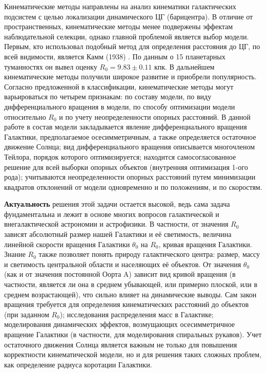 \documentclass[a4paper, oneside, 14pt]{article}
\begin{document}
Кинематические методы направлены на анализ кинематики галактических подсистем с целью локализации динамического ЦГ (барицентра). В отличие от пространственных, кинематические методы менее подвержены эффектам наблюдательной селекции, однако главной проблемой является выбор модели. Первым, кто использовал подобный метод для определения расстояния до ЦГ, по всей видимости, является Камм (1938) \cite{C.1938}. По данным о 15 планетарных туманностях он вывел оценку $ R_0 = 9.83 \pm 0.11 $ кпк. В дальнейшем кинематические методы получили широкое развитие и приобрели популярность. Согласно предложенной в \cite{N.2003} классификации, кинематические методы могут варьироваться по четырем признакам: по составу модели, по виду дифференциального вращения в модели, по способу оптимизации модели относительно $ R_0 $ и по учету неопределенности опорных расстояний. В данной работе в состав модели закладывается явление дифференциального вращения Галактики, предполагаемое осесимметричным, а также определяется остаточное движение Солнца; вид дифференциального вращения описывается многочленом Тейлора, порядок которого оптимизируется; находится самосогласованное решение для всей выборки опорных объектов (внутренняя оптимизация 1-ого рода); учитываются неопределенности опорных расстояний путем минимизации квадратов отклонений от модели одновременно и по положениям, и по скоростям.

\textbf{Актуальность} решения этой задачи остается высокой, ведь сама задача фундаментальна и лежит в основе многих вопросов галактической и внегалактической астрономии и астрофизики. В частности, от значения $ R_0 $ зависят \cite{N.2003} абсолютный размер нашей Галактики и её светимость, величина линейной скорости вращения Галактики $ \theta_0 $ на $ R_0 $, кривая вращения Галактики. Знание $ R_0 $ также позволяет понять природу галактического центра: размер, массу и светимость центральной области и населяющих её объектов. От значения $ \theta_0 $ (как и от значения постоянной Оорта A) зависит вид кривой вращения (в частности, является ли она в среднем убывающей, или примерно плоской, или в среднем возрастающей), что сильно влияет на динамические выводы. Сам закон вращения требуется для определения кинематических расстояний до объектов (при заданном $ R_0 $); исследования распределения масс в Галактике; моделирования динамических эффектов, возмущающих осесимметричное вращение Галактики (в частности, для моделирования спиральных рукавов). Учет остаточного движения Солнца является важным не только для повышения корректности кинематической модели, но и для решения таких сложных проблем, как определение радиуса коротации Галактики.
\end{document}
